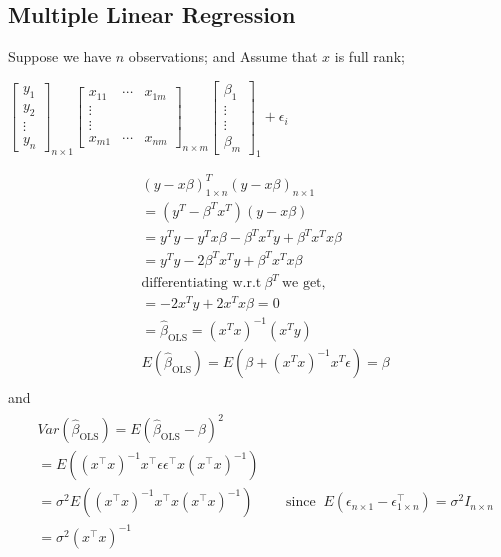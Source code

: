 \documentclass[12pt,a4paper]{article}
\begin{document}
\subsection*{Multiple Linear Regression}

Suppose we have \(n\) observations; and  Assume that \(x\) is full rank;

\(\left[\begin{array}{c}y_1 \\ y_2 \\ \vdots \\ y_n\end{array}\right]_{n \times 1}\left[\begin{array}{ccc}x_{11} & \cdots & x_{1 m} \\ \vdots & & \\ \vdots & & \\ x_{m 1} & \cdots & x_{n m}\end{array}\right]_{n \times m}\left[\begin{array}{c}\beta_1 \\ \vdots \\ \vdots \\ \beta_m\end{array}\right]_1 + \epsilon_{i}\)
 
\begin{align*}
    &\left( y-x\beta \right)^{T}_{1\times n}(y-x\beta)_{n\times 1}\\
    &=(y^T-\beta^Tx^T)(y-x\beta)\\
    &=y^Ty-y^Tx\beta-\beta^Tx^Ty+ \beta^{T}x^{T}x\beta\\
    &=y^T y-2\beta^{T} x^{T} y+ \beta^{T} x^{T} x \beta\\
    &\text{differentiating w.r.t} \ \beta^T \ \text{we get,}\\
    &=-2x^{T}y +2x^{T}x\beta =0 \\
    &=\hat{\beta}_{\text{OLS}}=\left( x^Tx \right)^{-1}(x^Ty)\\ 
    &E(\hat{\beta}_{\text{OLS}})=E(\beta + (x^Tx)^{-1}x^T \epsilon)= \beta\\
\end{align*}
and
\begin{align*}
    \begin{aligned}
    & Var(\hat{\beta}_{\text{OLS}})=E\left(\hat{\beta}_{\text {OLS}}-\beta\right)^2 \\
    &=E\left(\left(x^{\top} x\right)^{-1} x^{\top} \epsilon \epsilon^{\top} x\left(x^{\top} x\right)^{-1}\right) \\
    &= \sigma^2 E\left(\left(x^{\top} x\right)^{-1} x^{\top} x\left(x^{\top} x\right)^{-1}\right) \qquad \text{ since } \ E\left( \epsilon_{n \times 1}-\epsilon^{\top}_{1 \times n} \right) = \sigma^2I_{n \times n} \\
    &=\sigma^2\left(x^{\top} x\right)^{-1}
    \end{aligned}
    \end{align*}
\end{document}
